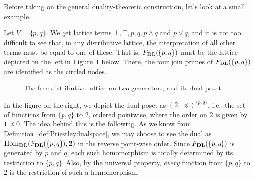   Before taking on the general duality-theoretic construction, let's look at a small example.
  \begin{example}\label{exa:twogen-logic}
    Let $V = \{p,q\}$. We get lattice terms $\bot,\top,p,q,p\wedge q$ and $p\vee q$, and it is not too difficult to see that, in any distributive lattice, the interpretation of all other terms must be equal to one of these. That is, $F_{\mathbf{DL}}(\{p,q\})$ must be the lattice depicted on the left in Figure~\ref{fig:freedltwo} below. There, the four join primes of $F_{\mathbf{DL}}(\{p,q\})$ are identified as the circled nodes.  
    \begin{figure}[htp]
      \begin{center}
      \end{center}
      \caption{The free distributive lattice on two generators, and its dual poset.}
      \label{fig:freedltwo}
      \end{figure}
 
 In the figure on the right, we depict the dual poset as $(2,\preceq)^{\{p,q\}}$, i.e., the set of functions from $\{p,q\}$ to $2$, ordered pointwise, where the order on $2$ is given by $1\preceq 0$. The idea behind this is the following. As we know from Definition~\ref{def:Priestleydualspace}, we may choose to see the dual as $\mathrm{Hom}_{\mathbf{DL}}(F_{\mathbf{DL}}(\{p,q\}),{\bf 2})$ in the reverse point-wise order. Since $F_{\mathbf{DL}}(\{p,q\})$ is generated by $p$ and $q$, each such homomorphism is totally determined by its restriction to $\{p,q\}$. Also, by the universal property, \emph{every} function from $\{p,q\}$ to $2$ is the restriction of such a homomorphism.
 

\end{example}
